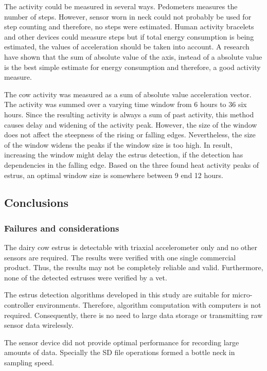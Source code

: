 \documentclass[english,12pt,a4paper,pdftex,elec,utf8]{aaltothesis}
\begin{document}
The activity could be measured in several ways. Pedometers measures the number of steps. However, sensor worn in neck could not probably be used for step counting and therefore, no steps were estimated. Human activity bracelets and other devices could measure steps but if total energy consumption is being estimated, the values of acceleration should be taken into account. A research have shown that the sum of absolute value of the axis, instead of a absolute value is the best simple estimate for energy consumption and therefore, a good activity measure.

The cow activity was measured as a sum of absolute value acceleration vector. The activity was summed over a varying time window from 6 hours to 36 six hours. Since the resulting activity is always a sum of past activity, this method causes delay and widening of the activity peak. However, the size of the window does not affect the steepness of the rising or falling edges. Nevertheless, the size of the window widens the peaks if the window size is too high. In result, increasing the window might delay the estrus detection, if the detection has dependencies in the falling edge. Based on the three found heat activity peaks of estrus, an optimal window size is somewhere between 9 end 12 hours.



\subsection{Conclusions} \label{conclusionssection}

\subsubsection{Failures and considerations}

The dairy cow estrus is detectable with triaxial accelerometer only and no other sensors are required. The results were verified with one single commercial product. Thus, the results may not be completely reliable and valid. Furthermore, none of the detected estruses were verified by a vet.

The estrus detection algorithms developed in this study are suitable for micro-controller environments. Therefore, algorithm computation with computers is not required. Consequently, there is no need to large data storage or transmitting raw sensor data wirelessly.

The sensor device did not provide optimal performance for recording large amounts of data. Specially the SD file operations formed a bottle neck in sampling speed.
\end{document}

